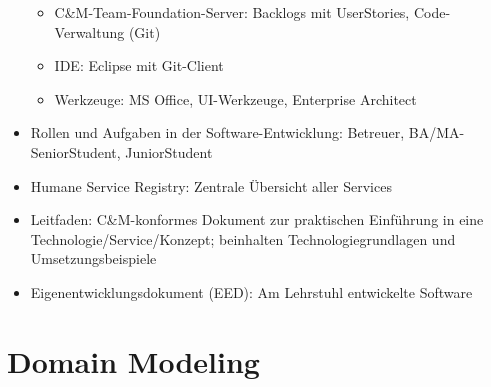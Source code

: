 \begin{itemize}
\begin{itemize}
		\item C\&M-Team-Foundation-Server: Backlogs mit UserStories, Code-Verwaltung (Git)
		\item IDE: Eclipse mit Git-Client
		\item Werkzeuge: MS Office, UI-Werkzeuge, Enterprise Architect
	\end{itemize}
	\item Rollen und Aufgaben in der Software-Entwicklung: Betreuer, BA/MA-SeniorStudent, JuniorStudent
	\item Humane Service Registry: Zentrale Übersicht aller Services
	\item Leitfaden: C\&M-konformes Dokument zur praktischen Einführung in eine Technologie/Service/Konzept; beinhalten Technologiegrundlagen und Umsetzungsbeispiele
	\item Eigenentwicklungsdokument (EED): Am Lehrstuhl entwickelte Software
\end{itemize}



\section{Domain Modeling}

